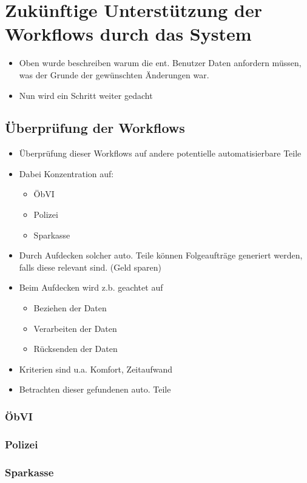 \chapter{Zukünftige Unterstützung der Workflows durch das System}

\begin{itemize}
	\item Oben wurde beschreiben warum die ent. Benutzer Daten anfordern müssen, was der Grunde der gewünschten Änderungen war.
	\item Nun wird ein Schritt weiter gedacht
\end{itemize}

\section{Überprüfung der Workflows}
\begin{itemize}
	\item Überprüfung dieser Workflows auf andere potentielle automatisierbare Teile
	\item Dabei Konzentration auf:
	\begin{itemize}
		\item \ac{ÖbVI}
		\item Polizei
		\item Sparkasse
	\end{itemize}
	\item Durch Aufdecken solcher auto. Teile können Folgeaufträge generiert werden, falls diese relevant sind. (Geld sparen)
	\item Beim Aufdecken wird z.b. geachtet auf
	\begin{itemize}
		\item Beziehen der Daten
		\item Verarbeiten der Daten
		\item Rücksenden der Daten
	\end{itemize}
	\item Kriterien sind u.a. Komfort, Zeitaufwand
	\item Betrachten dieser gefundenen auto. Teile
\end{itemize}
\subsection{\acl{ÖbVI}}
\subsection{Polizei}
\subsection{Sparkasse}

